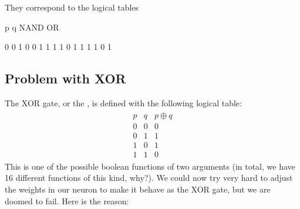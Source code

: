 \documentclass[a4paper,12pt,polish]{jupyterBook}
\begin{document}
\sphinxAtStartPar
They correspond to the logical tables
\begin{sphinxVerbatimInput}

\begin{sphinxVerbatim}[commandchars=\\\{\}]
 

   \PYG{p}{[}\PYG{p}{]} 
       \PYG{p}{[}\PYG{p}{]} 
\end{sphinxVerbatim}
\end{sphinxVerbatimInput}
\begin{sphinxVerbatimOutput}

\begin{sphinxVerbatim}[commandchars=\\\{\}]
p q  NAND OR

0 0   1   0
0 1   1   1
1 0   1   1
1 1   0   1
\end{sphinxVerbatim}
\end{sphinxVerbatimOutput}


\subsection{Problem with XOR}
\label{\detokenize{docs/mcp:problem-with-xor}}
\sphinxAtStartPar
The XOR gate, or the , is defined with the following logical table:
\begin{equation*}
\begin{split}
\begin{array}{ccc}
p & q & p \oplus q \\
0 & 0 & 0 \\
0 & 1 & 1 \\
1 & 0 & 1 \\
1 & 1 & 0
\end{array}
\end{split}
\end{equation*}
\sphinxAtStartPar
This is one of the possible boolean functions of two arguments (in total, we have 16 different functions of this kind, why?). We could now try very hard to adjust the weights in our neuron to make it behave as the XOR gate, but we are doomed to fail. Here is the reason:
\end{document}

